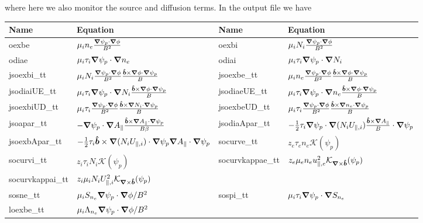where here we also monitor the source and diffusion terms.
In the output file we have
\begin{longtable}{llll}
\toprule
\rowcolor{gray!50}\textbf{Name} &  \textbf{Equation}&
\textbf{Name} &  \textbf{Equation}\\
\midrule
    oexbe &$\mu_i n_e \frac{\vn\psi_p\cn\phi}{B^2}$ &
    oexbi &$\mu_i N_i \frac{\vn\psi_p\cn\phi}{B^2}$ \\
    odiae &$\mu_i \tau_i\vn\psi_p\cn n_e$ &
    odiai &$\mu_i \tau_i\vn\psi_p\cn N_i$ \\
    jsoexbi\_tt &$\mu_i N_i \frac{\vn\psi_p\cn\phi}{B^2} \frac{\bhat\times\vn\phi\cn \psi_p}{B}$ &
    jsoexbe\_tt &$\mu_i n_e \frac{\vn\psi_p\cn\phi}{B^2} \frac{\bhat\times\vn\phi\cn \psi_p}{B}$ \\
    jsodiaiUE\_tt &$\mu_i \tau_i\vn\psi_p\cn N_i \frac{\bhat\times\vn\phi\cn \psi_p}{B}$ &
    jsodiaeUE\_tt &$\mu_i \tau_i\vn\psi_p\cn n_e \frac{\bhat\times\vn\phi\cn \psi_p}{B}$ \\
    jsoexbiUD\_tt &$\mu_i\tau_i \frac{\vn\psi_p\cn\phi}{B^2} \frac{\bhat\times\vn N_i\cn \psi_p}{B}$ &
    jsoexbeUD\_tt &$\mu_i\tau_i \frac{\vn\psi_p\cn\phi}{B^2} \frac{\bhat\times\vn n_e\cn \psi_p}{B}$ \\
    jsoapar\_tt &$ -\vn\psi_p\cn A_\parallel \frac{\bhat\times\vn A_\parallel\cn \psi_p}{B\beta}$ &
    jsodiaApar\_tt & $ -\frac{1}{2}\tau_i \vn\psi_p\cn  (N_iU_{\parallel,i})\frac{\bhat\times\vn A_\parallel}{B}\cn\psi_p$ \\
    jsoexbApar\_tt & $ -\frac{1}{2}\tau_i \bhat\times\vn  (N_iU_{\parallel,i})\cn\psi_p \vn A_\parallel\cn\psi_p$ &
    socurve\_tt &$z_e\tau_e n_e \mathcal K(\psi_p)$ \\
    socurvi\_tt &$z_i\tau_i N_i \mathcal K(\psi_p)$ &
    socurvkappae\_tt &$z_e\mu_e n_eu_{\parallel,e}^2 \mathcal K_{\vn\times\bhat}(\psi_p)$ \\
    socurvkappai\_tt &$z_i\mu_i N_iU_{\parallel,i}^2 \mathcal K_{\vn\times\bhat}(\psi_p)$ & \\
    sosne\_tt & $\mu_i S_{n_e} \vn\psi_p\cn\phi/B^2$ &
    sospi\_tt & $\mu_i \tau_i \vn\psi_p \cn S_{n_e}$\\
    loexbe\_tt & $ \mu_i \Lambda_{n_e} \vn\psi_p\cn\phi/B^2$ & \\
\bottomrule
\end{longtable}

